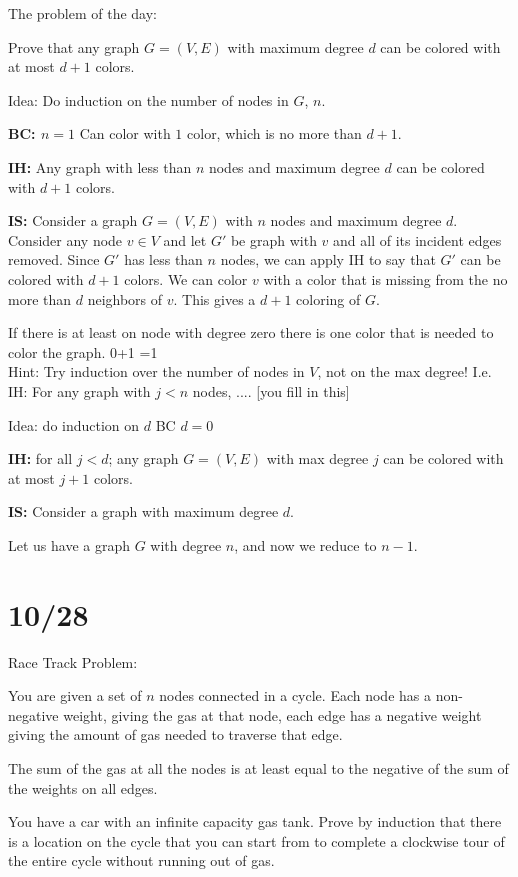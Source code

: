 \documentclass{article}
\begin{document}
The problem of the day:

Prove that any graph $G = (V,E)$ with maximum degree $d$ can be colored with at most $d+1$ colors.

Idea: Do induction on the number of nodes in $G$, $n$.

\noindent
\textbf{BC: $n = 1$} Can color with $1$ color, which is no more than $d+1$.

\noindent
\textbf{IH:} Any graph with less than $n$ nodes and maximum degree $d$ can be colored with $d+1$ colors.

\noindent
\textbf{IS:} Consider a graph $G = (V,E)$ with $n$ nodes and maximum degree $d$.  Consider any node $v \in V$ and let $G'$ be graph with $v$ and all of its incident edges removed.  Since $G'$ has less than $n$ nodes, we can apply IH to say that $G'$ can be colored with $d+1$ colors.  We can color $v$ with a color that is missing from the no more than $d$ neighbors of $v$.  This gives a $d+1$ coloring of $G$.



If there is at least on node with degree zero there is one color that is needed to color the graph. 0+1 =1\\

Hint: Try induction over the number of nodes in $V$, not on the max degree!  
I.e.  IH: For any graph with $j<n$ nodes, .... [you fill in this]


Idea: do induction on $d$
BC $d = 0$

\textbf{IH:}
for all $j<d$; any graph $G=(V,E)$ with max degree $j$ can be colored with at most $j+1$ colors.

\textbf{IS:}
Consider a graph with maximum degree $d$.  


Let us have a graph $G$ with degree $n$, and now we reduce to $n-1$.



\section{10/28}
Race Track Problem: 

You are given a set of $n$ nodes connected in a cycle.  Each node has a non-negative weight, giving the gas at that node, each edge has a negative weight giving the amount of gas needed to traverse that edge.

The sum of the gas at all the nodes is at least equal to the negative of the sum of the weights on all edges.

You have a car with an infinite capacity gas tank.  Prove by induction that there is a location on the cycle that you can start from to complete a clockwise tour of the entire cycle without running out of gas.
\end{document}
